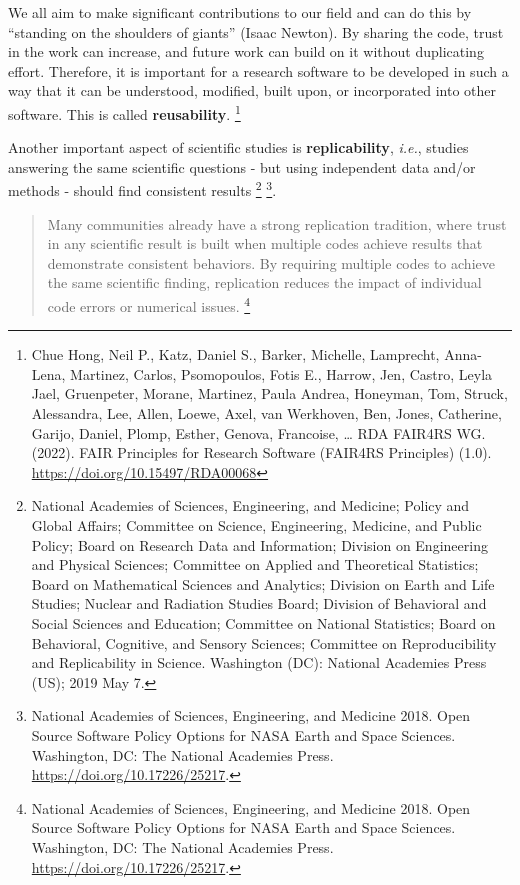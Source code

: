 \documentclass[
  letterpaper,
  DIV=11,
  numbers=noendperiod]{scrreport}
\begin{document}
We all aim to make significant contributions to our field and can do
this by ``standing on the shoulders of giants'' (Isaac Newton). By
sharing the code, trust in the work can increase, and future work can
build on it without duplicating effort. Therefore, it is important for a
research software to be developed in such a way that it can be
understood, modified, built upon, or incorporated into other software.
This is called \textbf{reusability}. \footnote{Chue Hong, Neil P., Katz,
  Daniel S., Barker, Michelle, Lamprecht, Anna-Lena, Martinez, Carlos,
  Psomopoulos, Fotis E., Harrow, Jen, Castro, Leyla Jael, Gruenpeter,
  Morane, Martinez, Paula Andrea, Honeyman, Tom, Struck, Alessandra,
  Lee, Allen, Loewe, Axel, van Werkhoven, Ben, Jones, Catherine, Garijo,
  Daniel, Plomp, Esther, Genova, Francoise, \ldots{} RDA FAIR4RS WG.
  (2022). FAIR Principles for Research Software (FAIR4RS Principles)
  (1.0). \url{https://doi.org/10.15497/RDA00068}}

Another important aspect of scientific studies is
\textbf{replicability}, \emph{i.e.}, studies answering the same
scientific questions - but using independent data and/or methods -
should find consistent results \footnote{National Academies of Sciences,
  Engineering, and Medicine; Policy and Global Affairs; Committee on
  Science, Engineering, Medicine, and Public Policy; Board on Research
  Data and Information; Division on Engineering and Physical Sciences;
  Committee on Applied and Theoretical Statistics; Board on Mathematical
  Sciences and Analytics; Division on Earth and Life Studies; Nuclear
  and Radiation Studies Board; Division of Behavioral and Social
  Sciences and Education; Committee on National Statistics; Board on
  Behavioral, Cognitive, and Sensory Sciences; Committee on
  Reproducibility and Replicability in Science. Washington (DC):
  National Academies Press (US); 2019 May 7.} \footnote{National
  Academies of Sciences, Engineering, and Medicine 2018. Open Source
  Software Policy Options for NASA Earth and Space Sciences. Washington,
  DC: The National Academies Press.
  \url{https://doi.org/10.17226/25217}.}.

\begin{quote}
Many communities already have a strong replication tradition, where
trust in any scientific result is built when multiple codes achieve
results that demonstrate consistent behaviors. By requiring multiple
codes to achieve the same scientific finding, replication reduces the
impact of individual code errors or numerical issues. \footnote{National
  Academies of Sciences, Engineering, and Medicine 2018. Open Source
  Software Policy Options for NASA Earth and Space Sciences. Washington,
  DC: The National Academies Press.
  \url{https://doi.org/10.17226/25217}.}
\end{quote}
\end{document}
